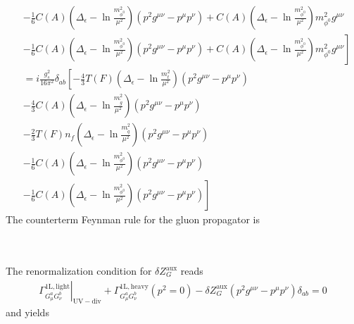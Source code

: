 \begin{align}
&-\frac{1}{6} C(A) \left( \Delta_\epsilon - \ln \frac{m_{\phi^0}^2}{\mu^2} \right)(p^2g^{\mu\nu}-p^\mu p^\nu) + C(A) \left( \Delta_\epsilon - \ln \frac{m_{\phi^0}^2}{\mu^2} \right)m_{\phi^0}^2 g^{\mu\nu} \nonumber\\
&\left.-\frac{1}{6} C(A) \left( \Delta_\epsilon - \ln \frac{m_{\phi^0}^2}{\mu^2} \right)(p^2g^{\mu\nu}-p^\mu p^\nu) + C(A) \left( \Delta_\epsilon - \ln \frac{m_{\phi^0}^2}{\mu^2} \right)m_{\phi^0}^2 g^{\mu\nu}\right]\nonumber\\
&= i\frac{g_s^2}{16\pi^2}\delta_{ab} \left[- \frac{4}{3}T(F)\left( \Delta_\epsilon - \ln \frac{m_t^2}{\mu^2} \right)(p^2g^{\mu\nu}-p^\mu p^\nu)\right.\nonumber\\
& - \frac{4}{3} C(A) \left( \Delta_\epsilon - \ln \frac{m_{\tilde{g}}^2}{\mu^2} \right)(p^2g^{\mu\nu}-p^\mu p^\nu)\nonumber\\
& -\frac{2}{3}T(F) n_f \left( \Delta_\epsilon - \ln \frac{m_{\tilde{q}}^2}{\mu^2} \right)(p^2g^{\mu\nu}-p^\mu p^\nu) \nonumber\\
&-\frac{1}{6} C(A) \left( \Delta_\epsilon - \ln \frac{m_{\phi^0}^2}{\mu^2} \right)(p^2g^{\mu\nu}-p^\mu p^\nu)  \nonumber\\
&\left.-\frac{1}{6} C(A) \left( \Delta_\epsilon - \ln \frac{m_{\phi^0}^2}{\mu^2} \right)(p^2g^{\mu\nu}-p^\mu p^\nu) \right]
\end{align}
The counterterm Feynman rule for the gluon propagator is\\
\\
\\
The renormalization condition for $\delta Z^{\mathrm{aux}}_G$ reads
\begin{align}
 \left.\Gamma^{\mathrm{1L,light}}_{G_\mu^a G_\nu^b}\right|_{\mathrm{UV-div}} + \Gamma^{\mathrm{1L,heavy}}_{G_\mu^a G_\nu^b}(p^2=0) - \delta Z_G^{\mathrm{aux}}\left(p^2 g^{\mu\nu} - p^\mu p^\nu \right)\delta_{ab} = 0
\end{align}
and yields
